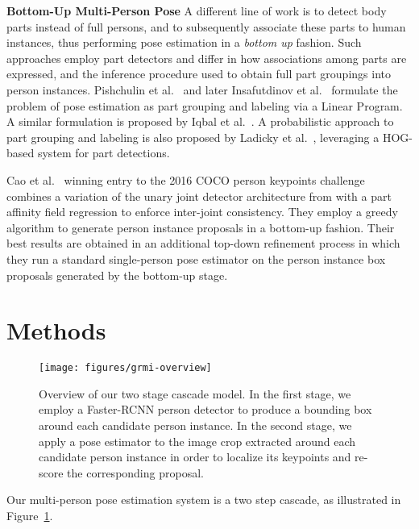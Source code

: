 \documentclass[10pt,twocolumn,letterpaper]{article}
\begin{document}
\textbf{Bottom-Up Multi-Person Pose}
A different line of work is to detect body parts instead of full persons, and to subsequently associate these parts to human instances, thus performing pose estimation in a \textit{bottom up} fashion. Such approaches employ part detectors and differ in how associations among parts are expressed, and the inference procedure used to obtain full part groupings into person instances. Pishchulin et al.~\cite{deepcut} and later Insafutdinov et al.~\cite{deeper_cut, insafutdinov2016articulated} formulate the problem of pose estimation as part grouping and labeling via a Linear Program. A similar formulation is proposed by Iqbal et al.~\cite{iqbal2016multi}. A probabilistic approach to part grouping and labeling is also proposed by Ladicky et al.~\cite{ladicky2013human}, leveraging a HOG-based system for part detections. 

Cao et al.~\cite{cmu_mscoco} winning entry to the 2016 COCO person keypoints challenge~\cite{lin2014microsoft} combines a variation of the unary joint detector architecture from \cite{wei2016convolutional} with a part affinity field regression to enforce inter-joint consistency. They employ a greedy algorithm to generate person instance proposals in a bottom-up fashion. Their best results are obtained in an additional top-down refinement process in which they run a standard single-person pose estimator \cite{wei2016convolutional} on the person instance box proposals generated by the bottom-up stage.



%
 \section{Methods}
\label{cascaded_pose_estimation_model}

\begin{figure}
\centering
\texttt{[image: figures/grmi-overview]}
\caption{\label{fig:grmi-overview}Overview of our two stage cascade model. In the first stage, we employ a Faster-RCNN person detector to produce a bounding box around each candidate person instance. In the second stage, we apply a pose estimator to the image crop extracted around each candidate person instance in order to localize its keypoints and re-score the corresponding proposal.}
\end{figure}

Our multi-person pose estimation system is a two step cascade, as illustrated in Figure~\ref{fig:grmi-overview}.
\end{document}
